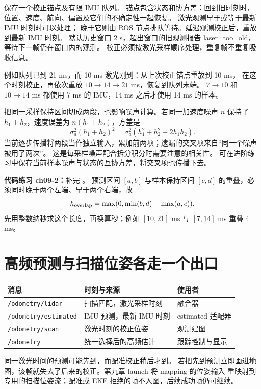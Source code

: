 

 保存一个校正锚点及有限 IMU 队列。
锚点包含状态和协方差：回到旧时刻时，位置、速度、航向、偏置及它们的不确定性一起恢复。
激光观测早于或等于最新 IMU 时刻时可以处理；
晚于它则由 ROS 节点排队等待。延迟观测校正后，重放到最新 IMU 时刻。
默认历史窗口 2 s，超出窗口的旧观测报告 laser\_too\_old，等待下一帧仍在窗口内的观测。
校正必须按激光采样顺序处理，重复帧不重复吸收信息。

例如队列已到 21 ms，而 10 ms 激光刚到：从上次校正锚点重放到 10 ms，
在这个时刻校正，再依次重放 $10\to14\to21$ ms，恢复到队列末端。
$7\to10$ 和 $10\to14$ ms 都使用 7 ms 的 IMU，14 ms 之后才使用 14 ms 的样本。

把同一采样保持区间切成两段，也影响噪声计算。若同一加速度噪声 $n$ 保持了
$h_1+h_2$，速度误差为 $n(h_1+h_2)$，方差是
\begin{equation}
\sigma_a^2(h_1+h_2)^2
=\sigma_a^2(h_1^2+h_2^2+2h_1h_2).
\end{equation}
当前逐步传播将两段当作独立输入，累加前两项；遗漏的交叉项来自“同一个噪声被用了两次”。
这是每采样噪声配合拆分积分时需要注意的相关性。
可在进阶练习中保存当前样本噪声与状态的互协方差，将交叉项也传播下去。

\textbf{代码练习 ch09-2：}补完 。
预测区间 $[a,b]$ 与样本保持区间 $[c,d]$ 的重叠，必须同时晚于两个左端、早于两个右端，故
\begin{equation}
h_{\rm overlap}=\max(0,\min(b,d)-\max(a,c)).
\end{equation}
先用整数纳秒求这个长度，再换算秒；例如 $[10,21]$ ms 与 $[7,14]$ ms 重叠 4 ms。

\section{高频预测与扫描位姿各走一个出口}
\begin{center}\small
\begin{tabular}{lll}\toprule
消息 & 时刻与来源 & 使用者 \\\midrule
\texttt{/odometry/lidar} & 扫描匹配，激光采样时刻 & 融合器 \\
\texttt{/odometry/estimated} & IMU 预测，最新 IMU 时刻 & estimated 适配器 \\
\texttt{/odometry/scan} & 激光时刻的校正位姿 & 观测建图 \\
\texttt{/odometry} & 统一选择后的高频估计 & 跟踪控制与显示 \\\bottomrule
\end{tabular}
\end{center}
同一激光时间的预测可能先到，而配准校正稍后才到。
若把先到预测立即画进地图，该帧就失去了后来的校正。第九章 launch 将 mapping 的位姿输入
重映射到专用的扫描位姿流；配准或 EKF 拒绝的帧不入图，后续成功帧仍可继续。

